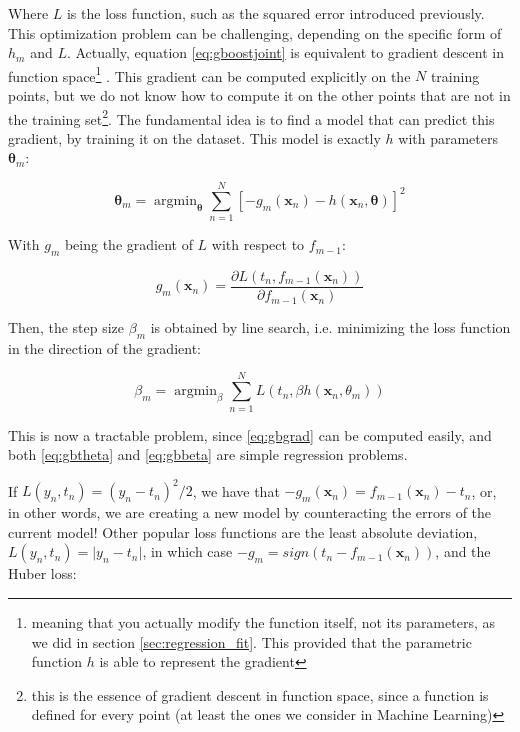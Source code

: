 \documentclass[12pt]{book}
\DeclareMathOperator*{\argmin}{argmin}
\begin{document}
Where $L$ is the loss function, such as the squared error introduced previously. This optimization problem can be challenging, depending on the specific form of $h_m$ and $L$. Actually, equation \ref{eq:gboostjoint} is equivalent to gradient descent in function space\footnote{meaning that you actually modify the function itself, not its parameters, as we did in section \ref{sec:regression_fit}. This provided that the parametric function $h$ is able to represent the gradient} \citep{boostinggd,greedyboosting}. This gradient can be computed explicitly on the $N$ training points, but we do not know how to compute it on the other points that are not in the training set\footnote{this is the essence of gradient descent in function space, since a function is defined for every point (at least the ones we consider in Machine Learning)}. The fundamental idea is to find a model that can predict this gradient, by training it on the dataset. This model is exactly $h$ with parameters $\bm\theta_m$:

\begin{equation}
\label{eq:gbtheta}
\bm\theta_m=\argmin_{\bm\theta}\sum_{n=1}^N \left[
-g_m(\bm x_n)-h(\bm x_n,\bm\theta)
\right]^2
\end{equation}

With $g_m$ being the gradient of $L$ with respect to $f_{m-1}$:

\begin{equation}
\label{eq:gbgrad}
g_m(\bm x_n)=\frac{\partial L(t_n,f_{m-1}(\bm x_n))}{\partial f_{m-1}(\bm x_n)}
\end{equation}

Then, the step size $\beta_m$ is obtained by line search, i.e. minimizing the loss function in the direction of the gradient:

\begin{equation}
\label{eq:gbbeta}
\beta_m=\argmin_{\beta}\sum_{n=1}^N L(t_n, \beta h(\bm x_n,\theta_m))
\end{equation}

This is now a tractable problem, since \ref{eq:gbgrad} can be computed easily, and both \ref{eq:gbtheta} and \ref{eq:gbbeta} are simple regression problems.

If $L(y_n,t_n)=(y_n-t_n)^2/2$, we have that $-g_m(\bm x_n)=f_{m-1}(\bm x_n)-t_n$, or, in other words, we are creating a new model by counteracting the errors of the current model! Other popular loss functions are the least absolute deviation, $L(y_n,t_n)=\vert y_n-t_n\vert$, in which case $-g_m=sign(t_n-f_{m-1}(\bm x_n))$, and the Huber loss:
\end{document}
